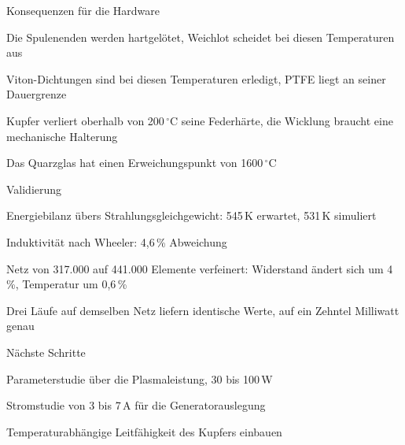 \documentclass[10pt,aspectratio=169]{beamer}
\makeatletter
\let\jlu@olditemize\itemize
\let\jlu@oldenditemize\enditemize
\renewenvironment{itemize}
  {\jlu@olditemize\setlength{\itemsep}{1pt}\setlength{\parsep}{0pt}\setlength{\topsep}{2pt}}
  {\jlu@oldenditemize}
\makeatother
\begin{document}
\begin{frame}{Konsequenzen für die Hardware}
  \vfill
  \large
  \begin{itemize}
    \item Die Spulenenden werden hartgelötet, Weichlot scheidet bei diesen Temperaturen aus
    \item Viton-Dichtungen sind bei diesen Temperaturen erledigt, PTFE liegt an seiner Dauergrenze
    \item Kupfer verliert oberhalb von 200\,$^\circ$C seine Federhärte, die Wicklung braucht eine mechanische Halterung
    \item Das Quarzglas hat einen Erweichungspunkt von 1600\,$^\circ$C
  \end{itemize}
  \vfill
\end{frame}

\begin{frame}{Validierung}
  \vfill
  \begin{itemize}
    \item Energiebilanz übers Strahlungsgleichgewicht: 545\,K erwartet, 531\,K simuliert
    \item Induktivität nach Wheeler: 4,6\,\% Abweichung
    \item Netz von 317.000 auf 441.000 Elemente verfeinert: Widerstand ändert sich um 4\,\%, Temperatur um 0,6\,\%
    \item Drei Läufe auf demselben Netz liefern identische Werte, auf ein Zehntel Milliwatt genau
  \end{itemize}
  \vfill
\end{frame}

\begin{frame}{Nächste Schritte}
  \vfill
  \large
  \begin{itemize}
    \item Parameterstudie über die Plasmaleistung, 30 bis 100\,W
    \item Stromstudie von 3 bis 7\,A für die Generatorauslegung
    \item Temperaturabhängige Leitfähigkeit des Kupfers einbauen
  \end{itemize}
  \vfill
\end{frame}

\end{document}
